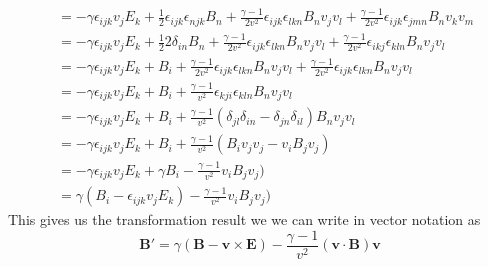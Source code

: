 \documentclass[11pt]{article}
\numberwithin{equation}{section}
\begin{document}
\begin{align*}
            &= -\gamma\epsilon_{ijk}v_jE_{k} + \frac{1}{2}\epsilon_{ijk}\epsilon_{njk}B_{n} + \frac{\gamma-1}{2v^2}\epsilon_{ijk}\epsilon_{lkn}B_{n}v_{j}v_{l} + \frac{\gamma-1}{2v^2}\epsilon_{ijk}\epsilon_{jmn}B_{n}v_{k}v_{m}\\
            &= -\gamma\epsilon_{ijk}v_jE_{k} + \frac{1}{2}2\delta_{in}B_{n} + \frac{\gamma-1}{2v^2}\epsilon_{ijk}\epsilon_{lkn}B_{n}v_{j}v_{l} + \frac{\gamma-1}{2v^2}\epsilon_{ikj}\epsilon_{kln}B_{n}v_{j}v_{l}\\
            &= -\gamma\epsilon_{ijk}v_jE_{k} + B_{i} + \frac{\gamma-1}{2v^2}\epsilon_{ijk}\epsilon_{lkn}B_{n}v_{j}v_{l} + \frac{\gamma-1}{2v^2}\epsilon_{ijk}\epsilon_{lkn}B_{n}v_{j}v_{l}\\
            &= -\gamma\epsilon_{ijk}v_jE_{k} + B_{i} + \frac{\gamma-1}{v^2}\epsilon_{kji}\epsilon_{kln}B_{n}v_{j}v_{l} \\
            &= -\gamma\epsilon_{ijk}v_jE_{k} + B_{i} + \frac{\gamma-1}{v^2}(\delta_{jl}\delta_{in}-\delta_{jn}\delta_{il})B_{n}v_{j}v_{l} \\
            &= -\gamma\epsilon_{ijk}v_jE_{k} + B_{i} + \frac{\gamma-1}{v^2}(B_{i}v_{j}v_{j}-v_{i}B_{j}v_{j}) \\
            &= -\gamma\epsilon_{ijk}v_jE_{k} + \gamma B_{i} - \frac{\gamma-1}{v^2}v_{i}B_{j}v_{j}) \\
            &= \gamma(B_{i}-\epsilon_{ijk}v_jE_{k}) - \frac{\gamma-1}{v^2}v_{i}B_{j}v_{j}) 
    \end{align*}
    This gives us the transformation result we we can write in vector notation as
    $$\mathbf{B}' = \gamma(\mathbf{B}-\mathbf{v}\times\mathbf{E}) - \frac{\gamma-1}{v^2}(\mathbf{v}\cdot\mathbf{B})\mathbf{v}$$

\pagebreak
\end{document}
